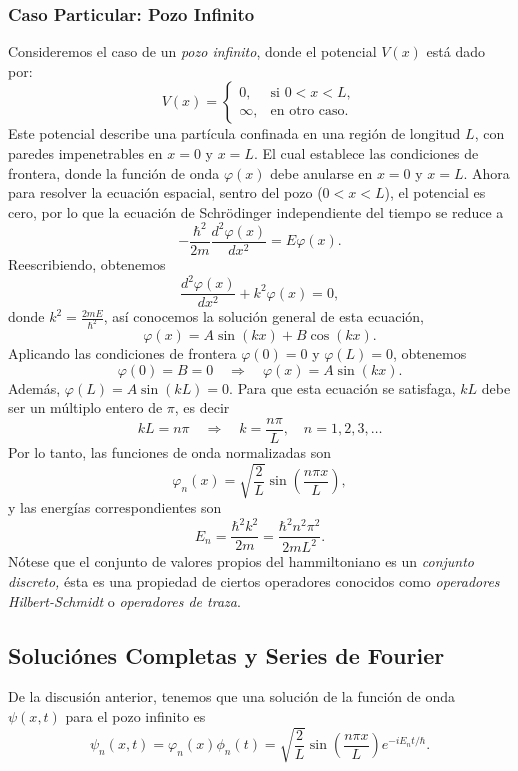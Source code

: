 \documentclass[main.tex]{subfiles}
\begin{document}
\subsubsection{Caso Particular: Pozo Infinito}
\noindent Consideremos el caso de un \emph{pozo infinito}, donde el potencial \(V(x)\) está dado por:
\[
V(x) =
\begin{cases}
0, & \text{si } 0 < x < L, \\
\infty, & \text{en otro caso}.
\end{cases}
\]
Este potencial describe una partícula confinada en una región de longitud \(L\), con paredes impenetrables en \(x = 0\) y \(x = L\). El cual establece las condiciones de frontera, donde la función de onda \(\varphi(x)\) debe anularse en \(x = 0\) y \(x = L\).
Ahora para resolver la ecuación espacial, sentro del pozo (\(0 < x < L\)), el potencial es cero, por lo que la ecuación de Schrödinger independiente del tiempo se reduce a
\[
-\frac{\hbar^2}{2m} \frac{d^2 \varphi(x)}{dx^2} = E \varphi(x).
\]
Reescribiendo, obtenemos
\[
\frac{d^2 \varphi(x)}{dx^2} + k^2 \varphi(x) = 0,
\]
donde \(k^2 = \frac{2mE}{\hbar^2}\), así conocemos la solución general de esta ecuación,
\[
\varphi(x) = A \sin(kx) + B \cos(kx).
\]
Aplicando las condiciones de frontera \(\varphi(0) = 0\) y \(\varphi(L) = 0\), obtenemos
\[
\varphi(0) = B = 0 \quad \Rightarrow \quad \varphi(x) = A \sin(kx).
\]
Además, \(\varphi(L) = A \sin(kL) = 0\). Para que esta ecuación se satisfaga, \(kL\) debe ser un múltiplo entero de \(\pi\), es decir
\[
kL = n\pi \quad \Rightarrow \quad k = \frac{n\pi}{L}, \quad n = 1, 2, 3, \dots
\]
Por lo tanto, las funciones de onda normalizadas son
\[
\varphi_n(x) = \sqrt{\frac{2}{L}} \sin\left(\frac{n\pi x}{L}\right),
\]
y las energías correspondientes son
\[
E_n = \frac{\hbar^2 k^2}{2m} = \frac{\hbar^2 n^2 \pi^2}{2mL^2}.
\]
\obs Nótese que el conjunto de valores propios del hammiltoniano es un \emph{conjunto discreto,} ésta es una propiedad de ciertos operadores conocidos como \emph{operadores Hilbert-Schmidt} o \emph{operadores de traza}.
\subsection{Soluciónes Completas y Series de Fourier}
\noindent De la discusión anterior, tenemos que una solución de la función de onda \(\psi(x, t)\) para el pozo infinito es
\[
\psi_n(x, t) = \varphi_n(x) \phi_n(t) = \sqrt{\frac{2}{L}} \sin\left(\frac{n\pi x}{L}\right) e^{-iE_n t/\hbar}.
\]
\end{document}
